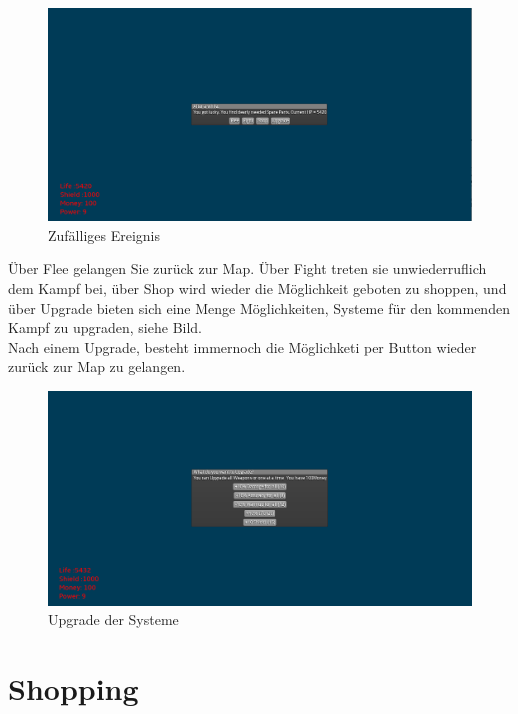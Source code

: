\documentclass[fontsize=12pt,paper=a4,twoside]{scrartcl}
\begin{document}
\begin{figure}[htp]
	\centering
	\includegraphics[width=1.00\linewidth]{pics/randomEreignis.png}
	\caption{Zufälliges Ereignis}
	\label{fig1}
\end{figure}

Über Flee gelangen Sie zurück zur Map. Über Fight treten sie unwiederruflich dem Kampf bei, über Shop wird wieder die Möglichkeit geboten zu shoppen, und über Upgrade bieten sich eine Menge Möglichkeiten, Systeme für den kommenden Kampf zu upgraden, siehe Bild.\\
Nach einem Upgrade, besteht immernoch die Möglichketi per Button wieder zurück zur Map zu gelangen.


\begin{figure}[htp]
	\centering
	\includegraphics[width=1.00\linewidth]{pics/upgrade.png}
	\caption{Upgrade der Systeme}
	\label{fig1}
\end{figure}

\section{Shopping}
\end{document}
